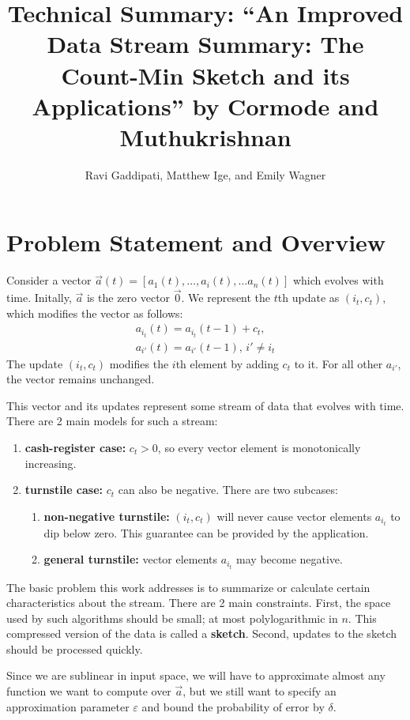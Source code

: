 \documentclass[11pt]{article}
\title{Technical Summary: ``An Improved Data Stream Summary: The Count-Min Sketch and its Applications'' 
by Cormode and Muthukrishnan}
\author{Ravi Gaddipati, Matthew Ige, and Emily Wagner}
\begin{document}
\maketitle
\section{Problem Statement and Overview}
Consider a vector $\vec{a}(t) = [a_1(t), \dots, a_i(t), \dots a_n(t)]$ which evolves with time.
Initally, $\vec{a}$ is the zero vector $\vec{0}$.  We represent the $t$th update as $(i_t, c_t)$,
which modifies the vector as follows:
\begin{align}
    a_{i_t}(t) = a_{i_t}(t - 1) + c_t, \\
    a_{i'}(t) = a_{i'}(t - 1), \, i' \neq i_t
\end{align}
The update $(i_t, c_t)$ modifies the $i$th element by adding $c_t$ to it.
For all other $a_{i'}$, the vector remains unchanged. 

This vector and its updates represent some stream of data that evolves with
time. There are 2 main models for such a stream:
\begin{enumerate}
    \item \textbf{cash-register case:} $c_t > 0$, so every vector element is monotonically
    increasing.
    \item \textbf{turnstile case:} $c_t$ can also be negative.  There are two subcases:
    \begin{enumerate}
        \item \textbf{non-negative turnstile:} $(i_t, c_t)$ will never cause vector elements
        $a_{i_t}$ to dip below zero. This guarantee can be provided by the application.
        \item \textbf{general turnstile:} vector elements $a_{i_t}$ may become negative.
    \end{enumerate}
\end{enumerate}

The basic problem this work addresses is to summarize or calculate certain
characteristics about the stream. There are 2 main constraints. First, the space
used by such algorithms should be small; at most polylogarithmic in $n$.  This
compressed version of the data is called a \textbf{sketch}.  Second, updates to
the sketch should be processed quickly.  


Since we are sublinear in input space, we will have to approximate almost any
function we want to compute over $\vec{a}$, but we still want to specify an
approximation parameter $\varepsilon$ and bound the probability of error by
$\delta$.  
\end{document}
